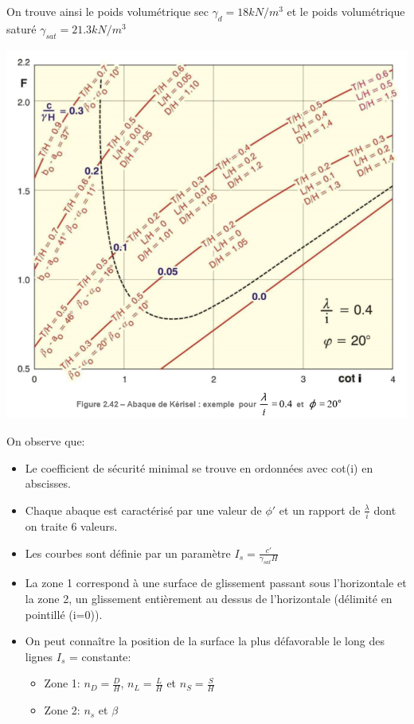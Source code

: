 On trouve ainsi le poids volumétrique sec $\gamma_d = 18kN/m^3$ et le poids volumétrique saturé $\gamma_{sat} = 21.3 kN/m^3$

\begin{center}
\includegraphics [scale=0.8]{pictures/242.PNG}
\end{center}

On observe que:
\begin{itemize}
    \item Le coefficient de sécurité minimal se trouve en ordonnées avec cot(i) en abscisses.
    \item Chaque abaque est caractérisé par une valeur de $\phi'$ et un rapport de $\frac{\lambda}{i}$ dont on traite 6 valeurs.
    \item Les courbes sont définie par un paramètre $I_s = \frac{c'}{\gamma_{sat} H}$
    \item La zone 1 correspond à une surface de glissement passant sous l'horizontale et la zone 2, un glissement entièrement au dessus de l'horizontale (délimité en pointillé (i=0)).
    \item On peut connaître la position de la surface la plus défavorable le long des lignes $I_s$ = constante:
    \begin{itemize}
        \item Zone 1: $n_D = \frac{D}{H}$, $n_L = \frac{L}{H}$ et $n_S = \frac{S}{H}$
        \item Zone 2: $n_s$ et $\beta$
    \end{itemize}
\end{itemize}

